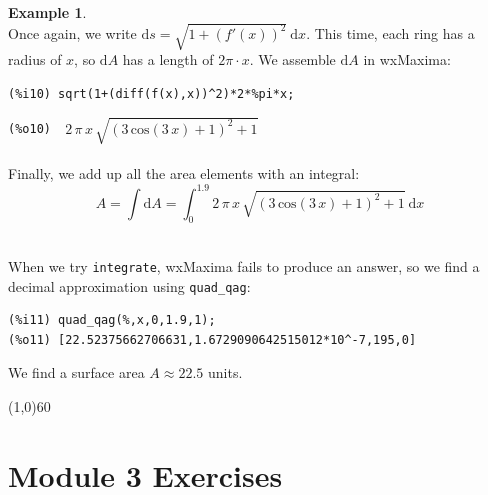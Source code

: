 \documentclass[10.5pt,twoside]{report}
\theoremstyle{definition}
\newtheorem{exmp}{Example}[section]
\begin{document}
\begin{exmp}
${}$\\

Once again, we write $\mathrm{d}s=\sqrt{1+(f'(x))^2}\ \mathrm{d}x$.  This time, each ring has a radius of $x$, so $\mathrm{d}A$ has a length of $2\pi\cdot x$.  We assemble $\mathrm{d}A$ in wxMaxima:

\begin{verbatim}
(%i10) sqrt(1+(diff(f(x),x))^2)*2*%pi*x;
\end{verbatim}
\verb|(%o10)  |$2\,\pi \,x\,\sqrt{{\left( 3\,\mathrm{cos}\left( 3\,x\right) +1\right) }^{2}+1}$\\
${}$\\
Finally, we add up all the area elements with an integral:
$$A=\int \mathrm{d}A = \int_0^{1.9} 2\,\pi \,x\,\sqrt{{\left( 3\,\mathrm{cos}\left( 3\,x\right) +1\right) }^{2}+1}\ \mathrm{d}x$$

${}$\\

When we try \verb|integrate|, wxMaxima fails to produce an answer, so we find a decimal approximation using \verb|quad_qag|:

\begin{verbatim}
(%i11) quad_qag(%,x,0,1.9,1);
(%o11) [22.52375662706631,1.6729090642515012*10^-7,195,0]
\end{verbatim}

We find a surface area $A\approx 22.5$ units.


\end{exmp}

\line(1,0){60}
\linethickness{0.5mm}
\pagebreak


\section{Module 3 Exercises}\label{Module 3 Exercises}
\end{document}

